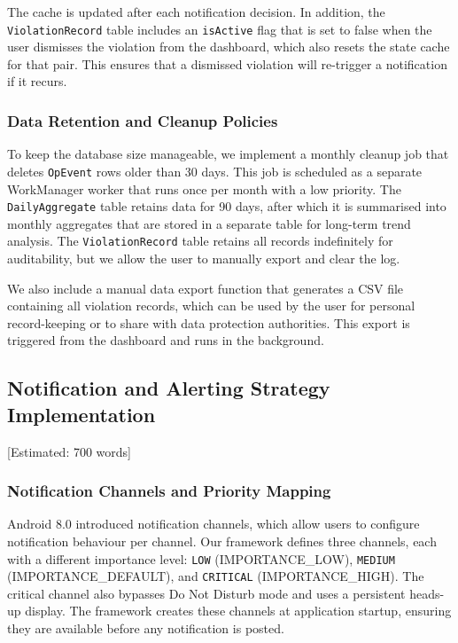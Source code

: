 The cache is updated after each notification decision. In addition, the \texttt{ViolationRecord} table includes an \texttt{isActive} flag that is set to false when the user dismisses the violation from the dashboard, which also resets the state cache for that pair. This ensures that a dismissed violation will re-trigger a notification if it recurs.

\subsubsection{Data Retention and Cleanup Policies}

To keep the database size manageable, we implement a monthly cleanup job that deletes \texttt{OpEvent} rows older than 30 days. This job is scheduled as a separate WorkManager worker that runs once per month with a low priority. The \texttt{DailyAggregate} table retains data for 90 days, after which it is summarised into monthly aggregates that are stored in a separate table for long-term trend analysis. The \texttt{ViolationRecord} table retains all records indefinitely for auditability, but we allow the user to manually export and clear the log.

We also include a manual data export function that generates a CSV file containing all violation records, which can be used by the user for personal record-keeping or to share with data protection authorities. This export is triggered from the dashboard and runs in the background.

\subsection{Notification and Alerting Strategy Implementation} [Estimated: 700 words]

\subsubsection{Notification Channels and Priority Mapping}

Android 8.0 introduced notification channels, which allow users to configure notification behaviour per channel. Our framework defines three channels, each with a different importance level: \texttt{LOW} (IMPORTANCE\_LOW), \texttt{MEDIUM} (IMPORTANCE\_DEFAULT), and \texttt{CRITICAL} (IMPORTANCE\_HIGH). The critical channel also bypasses Do Not Disturb mode and uses a persistent heads-up display. The framework creates these channels at application startup, ensuring they are available before any notification is posted.

